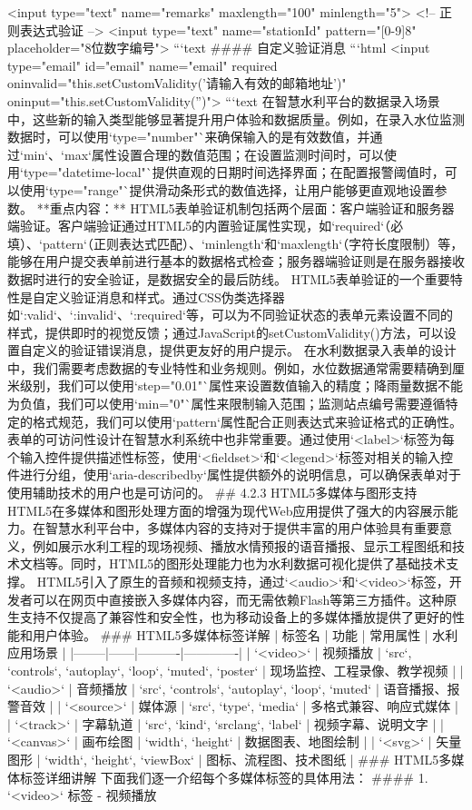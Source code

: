 <input type="text" name="remarks" maxlength="100" minlength="5"> <!-- 正则表达式验证 --> <input type="text" name="stationId" pattern="[0-9]{8}" placeholder="8位数字编号"> ```text #### 自定义验证消息 ```html <input type="email" id="email" name="email" required oninvalid="this.setCustomValidity('请输入有效的邮箱地址')" oninput="this.setCustomValidity('')"> ```text 在智慧水利平台的数据录入场景中，这些新的输入类型能够显著提升用户体验和数据质量。例如，在录入水位监测数据时，可以使用`type="number"`来确保输入的是有效数值，并通过`min`、`max`属性设置合理的数值范围；在设置监测时间时，可以使用`type="datetime-local"`提供直观的日期时间选择界面；在配置报警阈值时，可以使用`type="range"`提供滑动条形式的数值选择，让用户能够更直观地设置参数。 **重点内容：** HTML5表单验证机制包括两个层面：客户端验证和服务器端验证。客户端验证通过HTML5的内置验证属性实现，如`required`（必填）、`pattern`（正则表达式匹配）、`minlength`和`maxlength`（字符长度限制）等，能够在用户提交表单前进行基本的数据格式检查；服务器端验证则是在服务器接收数据时进行的安全验证，是数据安全的最后防线。 HTML5表单验证的一个重要特性是自定义验证消息和样式。通过CSS伪类选择器如`:valid`、`:invalid`、`:required`等，可以为不同验证状态的表单元素设置不同的样式，提供即时的视觉反馈；通过JavaScript的setCustomValidity()方法，可以设置自定义的验证错误消息，提供更友好的用户提示。 在水利数据录入表单的设计中，我们需要考虑数据的专业特性和业务规则。例如，水位数据通常需要精确到厘米级别，我们可以使用`step="0.01"`属性来设置数值输入的精度；降雨量数据不能为负值，我们可以使用`min="0"`属性来限制输入范围；监测站点编号需要遵循特定的格式规范，我们可以使用`pattern`属性配合正则表达式来验证格式的正确性。 表单的可访问性设计在智慧水利系统中也非常重要。通过使用`<label>`标签为每个输入控件提供描述性标签，使用`<fieldset>`和`<legend>`标签对相关的输入控件进行分组，使用`aria-describedby`属性提供额外的说明信息，可以确保表单对于使用辅助技术的用户也是可访问的。 ## 4.2.3 HTML5多媒体与图形支持 HTML5在多媒体和图形处理方面的增强为现代Web应用提供了强大的内容展示能力。在智慧水利平台中，多媒体内容的支持对于提供丰富的用户体验具有重要意义，例如展示水利工程的现场视频、播放水情预报的语音播报、显示工程图纸和技术文档等。同时，HTML5的图形处理能力也为水利数据可视化提供了基础技术支撑。 HTML5引入了原生的音频和视频支持，通过`<audio>`和`<video>`标签，开发者可以在网页中直接嵌入多媒体内容，而无需依赖Flash等第三方插件。这种原生支持不仅提高了兼容性和安全性，也为移动设备上的多媒体播放提供了更好的性能和用户体验。 ### HTML5多媒体标签详解 | 标签名 | 功能 | 常用属性 | 水利应用场景 | |--------|------|----------|-------------| | `<video>` | 视频播放 | `src`, `controls`, `autoplay`, `loop`, `muted`, `poster` | 现场监控、工程录像、教学视频 | | `<audio>` | 音频播放 | `src`, `controls`, `autoplay`, `loop`, `muted` | 语音播报、报警音效 | | `<source>` | 媒体源 | `src`, `type`, `media` | 多格式兼容、响应式媒体 | | `<track>` | 字幕轨道 | `src`, `kind`, `srclang`, `label` | 视频字幕、说明文字 | | `<canvas>` | 画布绘图 | `width`, `height` | 数据图表、地图绘制 | | `<svg>` | 矢量图形 | `width`, `height`, `viewBox` | 图标、流程图、技术图纸 | ### HTML5多媒体标签详细讲解 下面我们逐一介绍每个多媒体标签的具体用法： #### 1. `<video>` 标签 - 视频播放 
